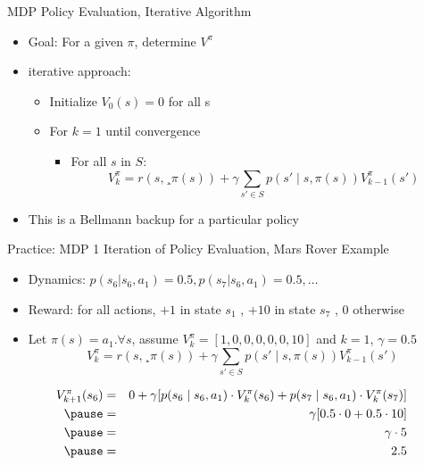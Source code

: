 \begin{frame}[c]{MDP Policy Evaluation, Iterative Algorithm}

\begin{itemize}
	\item Goal: For a given $\pi$, determine $V^\pi$
	\item iterative approach:
	\begin{itemize}
		\item Initialize $V_0(s) = 0 $ for all s
		\item For $k=1$ until convergence
		\begin{itemize}
			\item For all $s$ in $S$:
			$$V^\pi_k  = r(s, ¸\pi(s)) + \gamma \sum_{s'\in S} p(s'\mid s, \pi(s)) V_{k-1}^\pi (s')$$
		\end{itemize}
	\end{itemize}
	\item This is a Bellmann backup for a particular policy
\end{itemize}

\end{frame}
\begin{frame}[c]{Practice: MDP 1 Iteration of Policy Evaluation, Mars Rover Example}

\begin{itemize}
	\item Dynamics: $p(s_6 |s_6 , a_1 ) = 0.5, p(s_7 |s_6 , a_1 ) = 0.5, \ldots$
	\item Reward: for all actions, $+1$ in state $s_1$ , $+10$ in state $s_7$ , $0$ otherwise
	\item Let $\pi(s) = a_1.\forall s$, assume $V^\pi_k =[1,0,0,0,0,0,10]$ and $k = 1$, $\gamma = 0.5$
			$$V^\pi_k  = r(s, ¸\pi(s)) + \gamma \sum_{s'\in S} p(s'\mid s, \pi(s)) V_{k-1}^\pi (s')$$
\end{itemize}

\pause

\begin{eqnarray}
V^\pi_{k+1} (s_6) &=& 0  + \gamma [ p(s_6 \mid s_6, a_1) \cdot V^\pi_k(s_6) + p(s_7 \mid s_6 , a_1) \cdot V^\pi_k(s_7) ] \nonumber\\
\pause
&=& \gamma [0.5 \cdot 0 + 0.5 \cdot 10] \nonumber\\
\pause
&=& \gamma \cdot 5 \nonumber\\
\pause
&=& 2.5 \nonumber\\
\end{eqnarray}

\end{frame}
